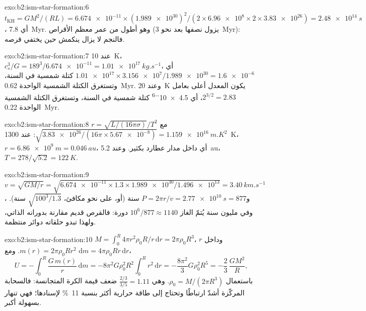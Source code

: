 \begin{solution}{exo:b2:ism-star-formation:6}
$t_{\mathrm{KH}} = GM^2/(RL) = \num{6.674e-11}\times(\num{1.989e30})^2/(2\times
\num{6.96e8}\times2\times\num{3.83e26}) = \qty{2.48e14}{s}$، أي
\qty{7.8}{Myr}. وهو أطول من عمر معظم الأقراص (يزول نصفها بعد
نحو \qty{3}{Myr}): فالنجم لا يزال ينكمش حين يختفي قرصه.
\end{solution}

\begin{solution}{exo:b2:ism-star-formation:7}
عند \qty{10}{K}، $c_s^3/G = 189^3/\num{6.674e-11} = \qty{1.01e17}{kg.s^{-1}}$، أي
$\num{1.01e17}\times\num{3.156e7}/\num{1.989e30} = \num{1.6e-6}$ كتلة شمسية في
السنة، وتستغرق الكتلة الشمسية الواحدة \qty{0.62}{Myr}. وعند \qty{20}{K} يكون المعدل
أعلى بعامل $2^{3/2} = 2.83$، أي \num{4.5e-6} كتلة شمسية في السنة، وتستغرق الكتلة
الشمسية الواحدة \qty{0.22}{Myr}.
\end{solution}

\begin{solution}{exo:b2:ism-star-formation:8}
$r = \sqrt{L/(16\pi\sigma)}/T^2$ مع $\sqrt{\num{3.83e26}/(16\pi\times\num{5.67e-8})}
= \qty{1.159e16}{m.K^2}$: عند \qty{1300}{K}، $r = \qty{6.86e9}{m} = \qty{0.046}{au}$،
أي داخل مدار عطارد بكثير. وعند \qty{5.2}{au}، $T = 278/\sqrt{5.2} = \qty{122}{K}$.
\end{solution}

\begin{solution}{exo:b2:ism-star-formation:9}
$v = \sqrt{GM/r} = \sqrt{\num{6.674e-11}\times1.3\times\num{1.989e30}/\num{1.496e13}}
= \qty{3.40}{km.s^{-1}}$، و$P = 2\pi r/v = \qty{2.77e10}{s} = 877$ سنة
(أو، على نحو مكافئ، $\sqrt{100^3/1.3}$ سنة). وفي مليون سنة يُتمّ الغاز
$10^6/877 \approx \num{1140}$ دورة: فالقرص قديم مقارنة بدورانه الذاتي،
ولهذا تبدو حلقاته دوائر منتظمة.
\end{solution}

\begin{solution}{exo:b2:ism-star-formation:10}
$M = \int_0^R 4\pi r^2\rho_0R/r\,\mathrm dr = 2\pi\rho_0R^3$، وداخل $r$
$m(r) = 2\pi\rho_0Rr^2$. ومع $\mathrm dm = 4\pi\rho_0Rr\,\mathrm dr$،
\[
  U = -\int_0^R \frac{G\,m(r)}{r}\,\mathrm dm
    = -8\pi^2G\rho_0^2R^2\int_0^R r^2\,\mathrm dr = -\frac{8\pi^2}{3}G\rho_0^2R^5
    = -\frac23\,\frac{GM^2}{R},
\]
باستعمال $\rho_0 = M/(2\pi R^3)$. وهي $\tfrac{2/3}{3/5} = 1.11$ ضعف قيمة الكرة المتجانسة:
فالسحابة المركّزة أشدّ ارتباطًا وتحتاج إلى طاقة حرارية أكثر بنسبة \qty{11}{\percent}
لإسنادها؛ فهي تنهار بسهولة أكبر.
\end{solution}

